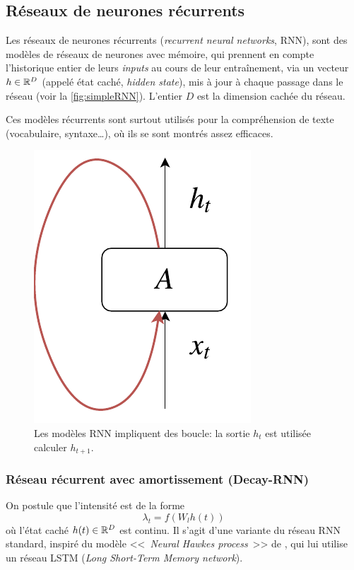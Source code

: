 \documentclass[../main.tex]{subfiles}
\begin{document}
\subsection{Réseaux de neurones récurrents}

Les réseaux de neurones récurrents (\textit{recurrent neural networks}, RNN), sont des modèles de réseaux de neurones avec mémoire, qui prennent en compte l'historique entier de leurs \textit{inputs} au cours de leur entraînement, via un vecteur $h\in\mathbb{R}^D$ (appelé état caché, \textit{hidden state}), mis à jour à chaque passage dans le réseau (voir la \autoref{fig:simpleRNN}). L'entier $D$ est la dimension cachée du réseau.

Ces modèles récurrents sont surtout utilisés pour la compréhension de texte (vocabulaire, syntaxe\ldots), où ils se sont montrés assez efficaces. \cite{unreasonableEffectivenessRNN}

\begin{figure}
	\centering
	\includegraphics[height=0.2\textheight]{diagrams/rnn.pdf}
	\caption{Les modèles RNN impliquent des boucle: la sortie $h_t$ est utilisée calculer $h_{t+1}$.}\label{fig:simpleRNN}
\end{figure}

\subsubsection{Réseau récurrent avec amortissement (Decay-RNN)}

On postule que l'intensité est de la forme
\begin{equation}\label{eq:decayrnnhiddenstate}
\lambda_t = f(W_l h(t))
\end{equation}
où l'état caché $h(t)\in\mathbb{R}^D$ est continu. Il s'agit d'une variante du réseau RNN standard, inspiré du modèle <<~\textit{Neural Hawkes process}~>> de \citeauthor{meiEisnerNeuralHawkes} \cite{meiEisnerNeuralHawkes}, qui lui utilise un réseau LSTM (\textit{Long Short-Term Memory network}).
\end{document}

